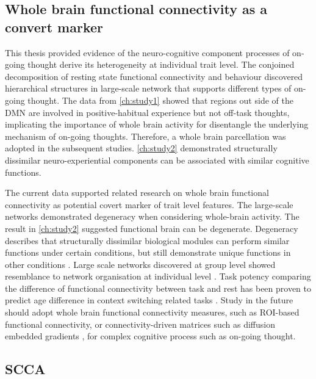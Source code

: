 \subsection{Whole brain functional connectivity as a convert marker}
This thesis provided evidence of the neuro-cognitive component processes of on-going thought derive its heterogeneity at individual trait level. The conjoined decomposition of resting state functional connectivity and behaviour discovered hierarchical structures in large-scale network  that supports different types of on-going thought. The data from \cref{ch:study1} showed that regions out side of the DMN are involved in positive-habitual experience but not off-task thoughts, implicating the importance of whole brain activity for disentangle the underlying mechanism of on-going thoughts. Therefore, a whole brain parcellation was adopted in the subsequent studies. \cref{ch:study2} demonstrated structurally dissimilar neuro-experiential components can be associated with similar cognitive functions. 

The current data supported related research on whole brain functional connectivity as potential covert marker of trait level features. The large-scale networks demonstrated degeneracy when considering whole-brain activity. The result in \cref{ch:study2} suggested functional brain can be degenerate. Degeneracy describes that structurally dissimilar biological modules can perform similar functions under certain conditions, but still demonstrate unique functions in other conditions \cite{Buckner2013}. Large scale networks discovered at group level showed resemblance to network organisation at individual level \cite{Finn2015}. Task potency comparing the difference of functional connectivity between task and rest has been proven to predict age difference in context switching related tasks \cite{Chauvin2018}. Study in the future should adopt whole brain functional connectivity measures, such as ROI-based functional connectivity, or connectivity-driven matrices such as diffusion embedded gradients \cite{Margulies2016,Marquand2017}, for complex cognitive process such as on-going thought.

\subsection{SCCA}


